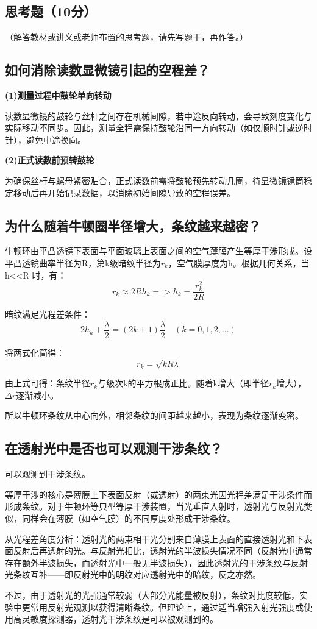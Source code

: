 \documentclass[]{../../templates/Report}%
\begin{document}
\begin{fullreportonly}
\section{思考题（10分）}
（解答教材或讲义或老师布置的思考题，请先写题干，再作答。）
\subsection{如何消除读数显微镜引起的空程差？}
\textbf{(1)测量过程中鼓轮单向转动}
\par
读数显微镜的鼓轮与丝杆之间存在机械间隙，若中途反向转动，会导致刻度变化与实际移动不同步。因此，测量全程需保持鼓轮沿同一方向转动（如仅顺时针或逆时针），避免中途换向。
\par

\textbf{(2)正式读数前预转鼓轮}
\par
为确保丝杆与螺母紧密贴合，正式读数前需将鼓轮预先转动几圈，待显微镜镜筒稳定移动后再开始记录数据，以消除初始间隙导致的空程误差。

\subsection{为什么随着牛顿圈半径增大，条纹越来越密？}
牛顿环由平凸透镜下表面与平面玻璃上表面之间的空气薄膜产生等厚干涉形成。设平凸透镜曲率半径为R，第k级暗纹半径为$r_k$，空气膜厚度为h。根据几何关系，当 h<<R 时，有：
\[
r_k \approx 2Rh_k  =>  h_k = \frac{r_k^2}{2R}
\]
\par
暗纹满足光程差条件：
\[
2h_k + \frac{\lambda}{2} = (2k+1)\frac{\lambda}{2} \quad (k = 0,1,2,...)
\]
\par
将两式化简得：
\[
r_k = \sqrt{kR\lambda}
\]
\par
由上式可得：条纹半径$r_k$与级次k的平方根成正比。随着k增大（即半径$r_k$增大），$\Delta r$逐渐减小。
\par
所以牛顿环条纹从中心向外，相邻条纹的间距越来越小，表现为条纹逐渐变密。

\subsection{在透射光中是否也可以观测干涉条纹？}
可以观测到干涉条纹。
\par
等厚干涉的核心是薄膜上下表面反射（或透射）的两束光因光程差满足干涉条件而形成条纹。对于牛顿环等典型等厚干涉装置，当光垂直入射时，透射光与反射光类似，同样会在薄膜（如空气膜）的不同厚度处形成干涉条纹。
\par
从光程差角度分析：透射光的两束相干光分别来自薄膜上表面的直接透射光和下表面反射后再透射的光。与反射光相比，透射光的半波损失情况不同（反射光中通常存在额外半波损失，而透射光中一般无半波损失），因此透射光的干涉条纹与反射光条纹互补——即反射光中的明纹对应透射光中的暗纹，反之亦然。
\par
不过，由于透射光的光强通常较弱（大部分光能量被反射），条纹对比度较低，实验中更常用反射光观测以获得清晰条纹。但理论上，通过适当增强入射光强度或使用高灵敏度探测器，透射光干涉条纹是可以被观测到的。

\end{fullreportonly}
\insertnotes
\end{document}
